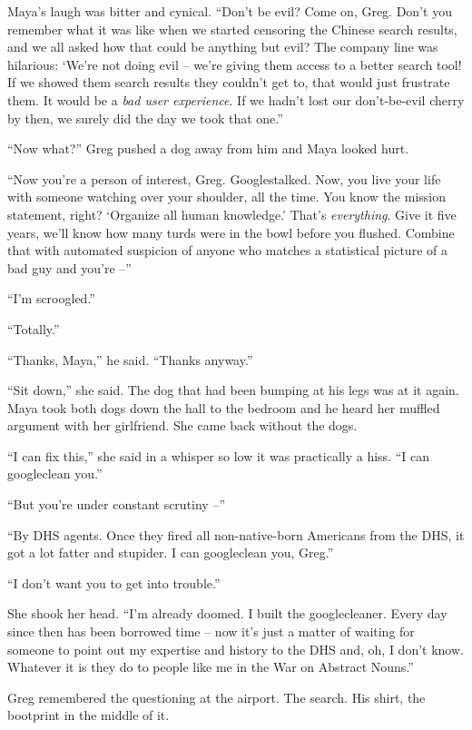 Maya's laugh was bitter and cynical. “Don't be evil? Come on, Greg. 
Don't you remember what it was like when we started censoring the 
Chinese search results, and we all asked how that could be anything but 
evil? The company line was hilarious: `We're not doing evil -- we're 
giving them access to a better search tool! If we showed them search 
results they couldn't get to, that would just frustrate them. It would 
be a \emph{bad user experience}. If we hadn't lost our don't-be-evil 
cherry by then, we surely did the day we took that one.”

“Now what?” Greg pushed a dog away from him and Maya looked hurt.

“Now you're a person of interest, Greg. Googlestalked. Now, you live 
your life with someone watching over your shoulder, all the time. You 
know the mission statement, right? `Organize all human knowledge.' 
That's \emph{everything}. Give it five years, we'll know how many turds 
were in the bowl before you flushed. Combine that with automated 
suspicion of anyone who matches a statistical picture of a bad guy and 
you're --”

“I'm scroogled.”

“Totally.”

“Thanks, Maya,” he said. “Thanks anyway.”

“Sit down,” she said. The dog that had been bumping at his legs was 
at it again. Maya took both dogs down the hall to the bedroom and he 
heard her muffled argument with her girlfriend. She came back without 
the dogs.

“I can fix this,” she said in a whisper so low it was practically a 
hiss. “I can googleclean you.”

“But you're under constant scrutiny --”

“By DHS agents. Once they fired all non-native-born Americans from 
the DHS, it got a lot fatter and stupider. I can googleclean you, 
Greg.”

“I don't want you to get into trouble.”

She shook her head. “I'm already doomed. I built the googlecleaner. 
Every day since then has been borrowed time -- now it's just a matter 
of waiting for someone to point out my expertise and history to the DHS 
and, oh, I don't know. Whatever it is they do to people like me in the 
War on Abstract Nouns.”

Greg remembered the questioning at the airport. The search. His shirt, 
the bootprint in the middle of it.

